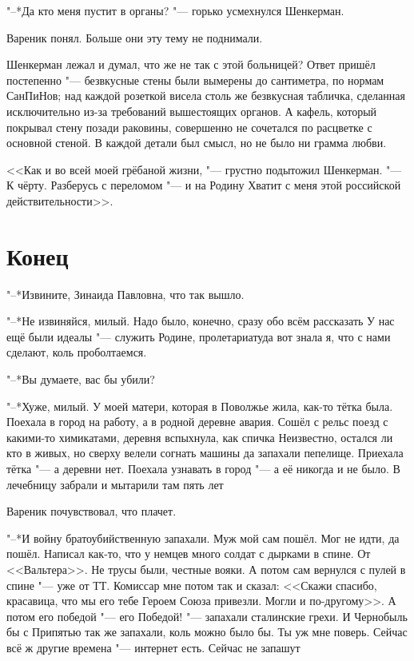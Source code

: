 "--*Да кто меня пустит в органы? "--- горько усмехнулся Шенкерман.

Вареник понял.
Больше они эту тему не поднимали.

Шенкерман лежал и думал, что же не так с этой больницей?
Ответ пришёл постепенно "--- безвкусные стены были вымерены до сантиметра, по нормам СанПиНов;
над каждой розеткой висела столь же безвкусная табличка, сделанная исключительно из-за требований вышестоящих органов.
А кафель, который покрывал стену позади раковины, совершенно не сочетался по расцветке с основной стеной.
В каждой детали был смысл, но не было ни грамма любви.

<<Как и во всей моей грёбаной жизни, "--- грустно подытожил Шенкерман.
"--- К чёрту.
Разберусь с переломом "--- и на Родину\ldotst
Хватит с меня этой российской действительности>>.

\section{Конец}

"--*Извините, Зинаида Павловна, что так вышло.

"--*Не извиняйся, милый.
Надо было, конечно, сразу обо всём рассказать\ldotst
У нас ещё были идеалы "--- служить Родине, пролетариату\ldotst да вот знала я, что с нами сделают, коль проболтаемся.

"--*Вы думаете, вас бы убили?

"--*Хуже, милый.
У моей матери, которая в Поволжье жила, как-то тётка была.
Поехала в город на работу, а в родной деревне авария.
Сошёл с рельс поезд с какими-то химикатами, деревня вспыхнула, как спичка\ldotst
Неизвестно, остался ли кто в живых, но сверху велели согнать машины да запахали пепелище. 
Приехала тётка "--- а деревни нет.
Поехала узнавать в город "--- а её никогда и не было.
В лечебницу забрали и мытарили там пять лет\ldotst

Вареник почувствовал, что плачет.

"--*И войну братоубийственную запахали.
Муж мой сам пошёл.
Мог не идти, да пошёл.
Написал как-то, что у немцев много солдат с дырками в спине.
От <<Вальтера>>.
Не трусы были, честные вояки.
А потом сам вернулся с пулей в спине "--- уже от ТТ.
Комиссар мне потом так и сказал: <<Скажи спасибо, красавица, что мы его тебе Героем Союза привезли.
Могли и по-другому>>.
А потом его победой "--- его Победой! "--- запахали сталинские грехи. 
И Чернобыль бы с Припятью так же запахали, коль можно было бы.
Ты уж мне поверь. 
Сейчас всё ж другие времена "--- интернет есть.
Сейчас не запашут\ldotst

